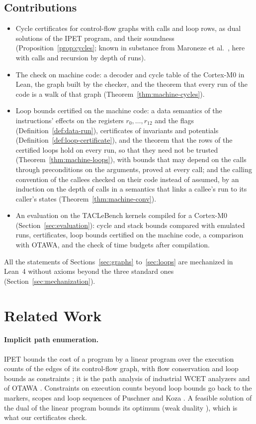 \documentclass[oneside,english]{amsart}
\numberwithin{equation}{section}
\theoremstyle{plain}
\theoremstyle{definition}
\theoremstyle{plain}
\theoremstyle{plain}
\theoremstyle{remark}
\begin{document}
\subsection*{Contributions}
\begin{itemize}
  \item Cycle certificates for control-flow graphs with calls and loop rows, as dual solutions of the IPET program, and their soundness (Proposition~\ref{prop:cycles}; known in substance from Maroneze et al.\ \cite{maroneze2014formally}, here with calls and recursion by depth of runs).
  \item The check on machine code: a decoder and cycle table of the Cortex-M0 in Lean, the graph built by the checker, and the theorem that every run of the code is a walk of that graph (Theorem~\ref{thm:machine-cycles}).
  \item Loop bounds certified on the machine code: a data semantics of the instructions' effects on the registers $r_0, \dots, r_{12}$ and the flags (Definition~\ref{def:data-run}), certificates of invariants and potentials (Definition~\ref{def:loop-certificate}), and the theorem that the rows of the certified loops hold on every run, so that they need not be trusted (Theorem~\ref{thm:machine-loops}), with bounds that may depend on the calls through preconditions on the arguments, proved at every call; and the calling convention of the callees checked on their code instead of assumed, by an induction on the depth of calls in a semantics that links a callee's run to its caller's states (Theorem~\ref{thm:machine-conv}).
  \item An evaluation on the TACLeBench kernels compiled for a Cortex-M0 (Section~\ref{sec:evaluation}): cycle and stack bounds compared with emulated runs, certificates, loop bounds certified on the machine code, a comparison with OTAWA, and the check of time budgets after compilation.
\end{itemize}
All the statements of Sections~\ref{sec:graphs} to~\ref{sec:loops} are mechanized in Lean~4 without axioms beyond the three standard ones (Section~\ref{sec:mechanization}).

\section{Related Work}
\label{sec:related}

\paragraph{Implicit path enumeration.} IPET bounds the cost of a program by a linear program over the execution counts of the edges of its control-flow graph, with flow conservation and loop bounds as constraints \cite{li1995ilp}; it is the path analysis of industrial WCET analyzers \cite{wilhelm2008worst} and of OTAWA \cite{ballabriga2010otawa}. Constraints on execution counts beyond loop bounds go back to the markers, scopes and loop sequences of Puschner and Koza \cite{puschner1989calculating}. A feasible solution of the dual of the linear program bounds its optimum (weak duality \cite{schrijver1986theory}), which is what our certificates check.
\end{document}
